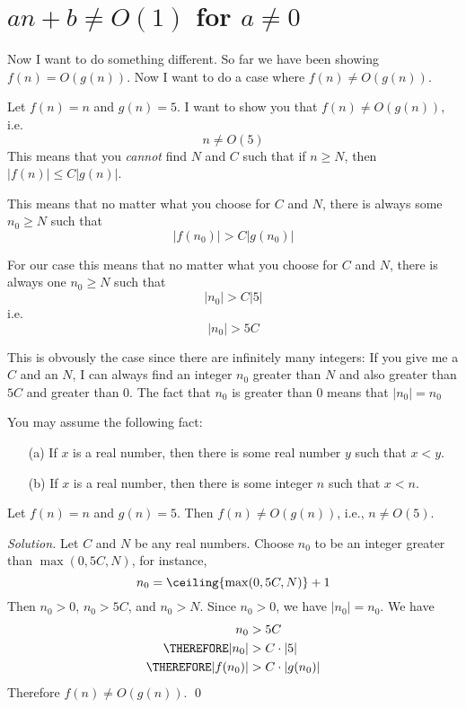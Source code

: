 \section{$an+b \neq O(1)$ for $a \neq 0$}

Now I want to do something different.
So far we have been showing $f(n) = O(g(n))$.
Now I want to do a case where $f(n) \neq O(g(n))$.

Let $f(n) = n$ and $g(n) = 5$.
I want to show you that $f(n) \neq O(g(n))$, i.e.
\[
n \neq O(5)
\]
This means that you \textit{cannot} find $N$ and $C$ such that
if $n \geq N$, then $|f(n)| \leq C|g(n)|$.

This means that no matter what you choose for $C$ and $N$, 
there is always some $n_0 \geq N$ such that 
\[
|f(n_0)| > C|g(n_0)|
\]

For our case this means that no matter what you choose for $C$
and $N$,
there is always one $n_0 \geq N$ such that 
\[
|n_0| > C|5|
\]
i.e.
\[
|n_0| > 5C
\]

This is obvously the case since there are infinitely many integers:
If you give me a $C$ and an $N$, I can always find an integer 
$n_0$ greater than $N$ and also greater than $5C$ and greater than $0$.
The fact that $n_0$ is greater than $0$ means that $|n_0| = n_0$

You may assume the following fact:
\begin{itemize}
\item[(a)] If $x$ is a real number, then there is some real number
$y$ such that $x < y$.
\item[(b)] If $x$ is a real number, then there is some integer
$n$ such that $x < n$.
\end{itemize}

\begin{eg}
Let $f(n) = n$ and $g(n) = 5$. Then $f(n) \neq O(g(n))$, 
i.e., $n \neq O(5)$.
\end{eg}

\textit{Solution.}
Let $C$ and $N$ be any real numbers.
Choose $n_0$ to be an integer greater than 
$\max(0, 5C, N)$, for instance,
\[
n_0 = \ceiling{\max(0, 5C, N)} + 1
\]
Then $n_0 > 0$, $n_0 > 5C$, and $n_0 > N$.
Since $n_0 > 0$, we have $|n_0| = n_0$.
We have
\begin{align*}
n_0 &> 5C \\
\THEREFORE |n_0| &> C \cdot |5| \\
\THEREFORE |f(n_0)| &> C \cdot |g(n_0)|
\end{align*}
Therefore $f(n) \neq O(g(n))$.
\qed


